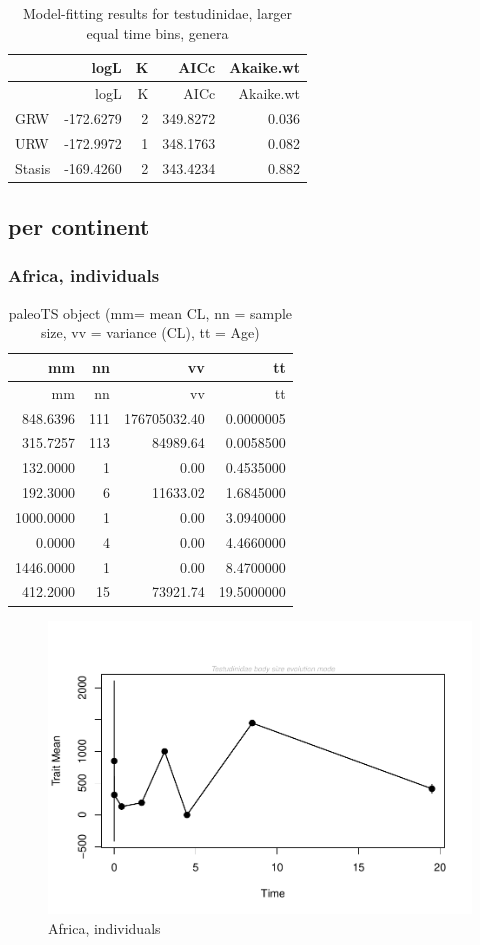 \documentclass[]{article}
\begin{document}
\begin{longtable}[]{@{}lrrrr@{}}
\caption{Model-fitting results for testudinidae, larger equal time bins,
genera}\tabularnewline
\toprule
& logL & K & AICc & Akaike.wt\tabularnewline
\midrule
\endfirsthead
\toprule
& logL & K & AICc & Akaike.wt\tabularnewline
\midrule
\endhead
GRW & -172.6279 & 2 & 349.8272 & 0.036\tabularnewline
URW & -172.9972 & 1 & 348.1763 & 0.082\tabularnewline
Stasis & -169.4260 & 2 & 343.4234 & 0.882\tabularnewline
\bottomrule
\end{longtable}

\newpage

\subsection{per continent}\label{per-continent}

\subsubsection{Africa, individuals}\label{africa-individuals}

\begin{longtable}[]{@{}rrrr@{}}
\caption{paleoTS object (mm= mean CL, nn = sample size, vv = variance
(CL), tt = Age)}\tabularnewline
\toprule
mm & nn & vv & tt\tabularnewline
\midrule
\endfirsthead
\toprule
mm & nn & vv & tt\tabularnewline
\midrule
\endhead
848.6396 & 111 & 176705032.40 & 0.0000005\tabularnewline
315.7257 & 113 & 84989.64 & 0.0058500\tabularnewline
132.0000 & 1 & 0.00 & 0.4535000\tabularnewline
192.3000 & 6 & 11633.02 & 1.6845000\tabularnewline
1000.0000 & 1 & 0.00 & 3.0940000\tabularnewline
0.0000 & 4 & 0.00 & 4.4660000\tabularnewline
1446.0000 & 1 & 0.00 & 8.4700000\tabularnewline
412.2000 & 15 & 73921.74 & 19.5000000\tabularnewline
\bottomrule
\end{longtable}

\begin{figure}[htbp]
\centering
\includegraphics{MA_JJ_files/figure-latex/paleoTS, individuals, Africa-1.pdf}
\caption{Africa, individuals}
\end{figure}
\end{document}
